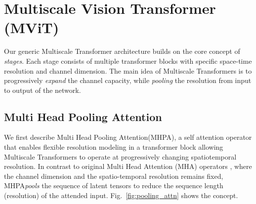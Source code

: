 \documentclass[10pt,twocolumn,letterpaper]{article}
\newcommand{\figref}[1]{Fig.~\ref{#1}}
\def\x{$\times$}
\newcommand{\attnnameCC}{Multi Head Pooling Attention\xspace}
\newcommand{\attnabbvspace}{MHPA\xspace}
\newcommand{\attnabbv}{MHPA\xspace}
\begin{document}
\newcommand{\outsizesRaw}[4]{\multirow{#4}{*}{\(\begin{array}{c}  \text{#1$\times$#2\x #3}\\[-.1em]  \end{array}\)}}
\newcommand{\outsizesRawD}[5]{\multirow{#5}{*}{\(\begin{array}{c}  \text{#1\x#2\x#3\x#4}\\[-.1em]  \end{array}\)}}

\newcommand{\outsizesGamma}[4]{\multirow{#4}{*}{\(\begin{array}{c}  \text{#1\gat\x (#2\gaxy)$^2$}\\[-.1em]  \end{array}\)}}

\newcommand{\outsizesSF}[5]{\multirow{#5}{*}{\(\begin{array}{cc} \text{\emph{Slow}}:& \text{#1$\times$ #2$^\text{2}$}\\[-.1em] \text{\emph{Fast}}:& \text{#3$\times$#4$^\text{2}$}\end{array}\)}}


\section{Multiscale Vision Transformer (MViT)} \label{sec:method} 
Our generic Multiscale Transformer architecture builds on the core concept of \textit{stages}. Each stage consists of multiple transformer blocks with specific space-time resolution and channel dimension. The main idea of Multiscale Transformers is to progressively \textit{expand} the channel capacity, while \textit{pooling} the resolution from input to output of the network. 

\subsection{\attnnameCC}
\label{sec:pooling_attn}

We first describe \attnnameCC (\attnabbv), a self attention operator that enables flexible resolution modeling in a transformer block allowing Multiscale Transformers to operate at progressively changing spatiotemporal resolution. In contrast to original Multi Head Attention (MHA) operators \cite{vaswani2017attention}, where the channel dimension and the spatio-temporal resolution remains fixed, \attnabbvspace \textit{pools} the sequence of latent tensors to reduce the sequence length (resolution) of the attended input.  \figref{fig:pooling_attn} shows the concept.
\end{document}
